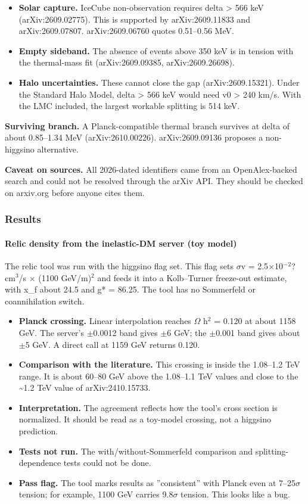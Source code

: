 \documentclass[11pt,a4paper]{article}
\begin{document}
\begin{itemize}
  \item \textbf{Solar capture.} IceCube non-observation requires delta \textgreater{} 566 keV (arXiv:2609.02775). This is supported by arXiv:2609.11833 and arXiv:2609.07807. arXiv:2609.06760 quotes 0.51--0.56 MeV.
  \item \textbf{Empty sideband.} The absence of events above 350 keV is in tension with the thermal-mass fit (arXiv:2609.09385, arXiv:2609.26698).
  \item \textbf{Halo uncertainties.} These cannot close the gap (arXiv:2609.15321). Under the Standard Halo Model, delta \textgreater{} 566 keV would need v0 \textgreater{} 240 km/s. With the LMC included, the largest workable splitting is 514 keV.
\end{itemize}
\textbf{Surviving branch.} A Planck-compatible thermal branch survives at delta of about 0.85--1.34 MeV (arXiv:2610.00226). arXiv:2609.09136 proposes a non-higgsino alternative.

\textbf{Caveat on sources.} All 2026-dated identifiers came from an OpenAlex-backed search and could not be resolved through the arXiv API. They should be checked on arxiv.org before anyone cites them.

\subsubsection*{Results}
\paragraph{Relic density from the inelastic-DM server (toy model)}
The relic tool was run with the higgsino flag set. This flag sets $\sigma$v = 2.5$\times$10$^-$$^2$? cm$^3$/s $\times$ (1100 GeV/m)$^2$ and feeds it into a Kolb--Turner freeze-out estimate, with x\_f about 24.5 and g* = 86.25. The tool has no Sommerfeld or coannihilation switch.

\begin{itemize}
  \item \textbf{Planck crossing.} Linear interpolation reaches $\Omega$ h$^2$ = 0.120 at about 1158 GeV. The server's $\pm$0.0012 band gives $\pm$6 GeV; the $\pm$0.001 band gives about $\pm$5 GeV. A direct call at 1159 GeV returns 0.120.
  \item \textbf{Comparison with the literature.} This crossing is inside the 1.08--1.2 TeV range. It is about 60--80 GeV above the 1.08--1.1 TeV values and close to the \textasciitilde{}1.2 TeV value of arXiv:2410.15733.
  \item \textbf{Interpretation.} The agreement reflects how the tool's cross section is normalized. It should be read as a toy-model crossing, not a higgsino prediction.
  \item \textbf{Tests not run.} The with/without-Sommerfeld comparison and splitting-dependence tests could not be done.
  \item \textbf{Pass flag.} The tool marks results as ''consistent'' with Planck even at 7--25$\sigma$ tension; for example, 1100 GeV carries 9.8$\sigma$ tension. This looks like a bug.
\end{itemize}
\end{document}
